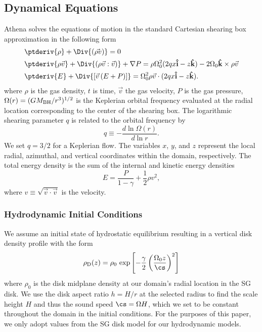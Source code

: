 \subsection{Dynamical Equations} \label{sec:dyn-eq}
Athena solves the equations of motion in the standard Cartesian shearing box approximation in the following form
\begin{align}
    &\ptderiv{\rho} + \Div{\left(\rho\vec{}{v}\right)} = 0
    \label{eqn:cons_mass} \\
    &\ptderiv{\rho \vec{v}} + \Div{\left(\rho \vec{v} : \vec{v}\right)} + \nabla P =
    \rho \Omega_{0}^{2}(2qx{\bf \hat{i}} - z{\bf \hat{k}}) - 2\Omega_{0} {\bf \hat{k}} \times \rho \vec{v}
    \label{eqn:cons_momentum} \\
    &\ptderiv{E} + \Div{\left[\vec{v}\left(E + P\right)\right]} =
    \Omega_{0}^{2}\rho\vec{v} \cdot (2qx{\bf \hat{i}} - z{\bf \hat{k}}).
    \label{eqn:cons_energy}
\end{align}
where $\rho$ is the gas density, $t$ is time, $\vec{v}$ the gas velocity, $P$ is the gas pressure, $\Omega(r) = (GM_{\rm BH}/r^3)^{1/2}$ is the Keplerian orbital frequency evaluated at the radial location corresponding to the center of the shearing box.
The logarithmic shearing parameter $q$ is related to the orbital frequency by
\begin{equation}
    q \equiv -\frac{d\ln\Omega(r)}{d\ln r}.
\end{equation}
We set $q=3/2$ for a Keplerian flow.
The variables $x$, $y$, and $z$ represent the local radial, azimuthal, and vertical coordinates within the domain, respectively.
The total energy density is the sum of the internal and kinetic energy densities
\begin{equation}
    E = \frac{P}{1-\gamma} + \frac{1}{2}\rho v^2,
\end{equation}
where $v \equiv \sqrt{ \vec{v} \cdot \vec{v} }$ is the velocity.


\subsubsection{Hydrodynamic Initial Conditions} \label{sec:ICs}

 \label{sec:disk-model}

We assume an initial state of hydrostatic equilibrium resulting in a vertical disk density profile with the form
\begin{equation} \label{eqn:disk-z-profile}
    \rho_{\rm D} (z) = \rho_0 \, \exp\left[-\frac{\gamma}{2} \left(\frac{\Omega_0 z}{\cs}\right)^2 \right]
\end{equation}
where $\rho_0$ is the disk midplane density at our domain's radial location in the SG disk. We use the disk aspect ratio $h=H/r$ at the selected radius to find the scale height $H$ and thus the sound speed $\cs=\Omega H$, which we set to be constant throughout the domain in the initial conditions.
For the purposes of this paper, we only adopt values from the SG disk model for our hydrodynamic models.



